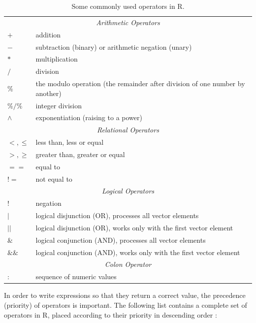 \begin{table}[H]
\centering
\caption{Some commonly used operators in R.}
\begin{tabular}{ll}
\toprule
\multicolumn{2}{c}{\emph{Arithmetic Operators}} \\

$+$ & addition \\
$-$ & subtraction (binary) or arithmetic negation (unary) \\
$*$ & multiplication \\
$/$ & division \\
$\%$ & the modulo operation (the remainder after division of one number by another) \\
$\%/\%$ & integer division \\
$\wedge$ & exponentiation (raising to a power) \\

\multicolumn{2}{c}{\emph{Relational Operators}} \\

$<, \le$ & less than, less or equal \\
$>, \ge$ & greater than, greater or equal \\
$==$ & equal to \\
$!=$ & not equal to \\

\multicolumn{2}{c}{\emph{Logical Operators}} \\

$!$ & negation \\
$|$ & logical disjunction (OR), processes all vector elements \\
$||$ & logical disjunction (OR), works only with the first vector element \\
$\&$ & logical conjunction (AND), processes all vector elements \\
$\&\&$ & logical conjunction (AND), works only with the first vector element \\

\multicolumn{2}{c}{\emph{Colon Operator}} \\

$:$ & sequence of numeric values \\
\bottomrule
\end{tabular}
\end{table}

In order to write expressions so that they return a correct value, the precedence (priority) of operators is important. The following list contains a complete
set of operators in R, placed according to their priority in descending order \cite{ref260}:

